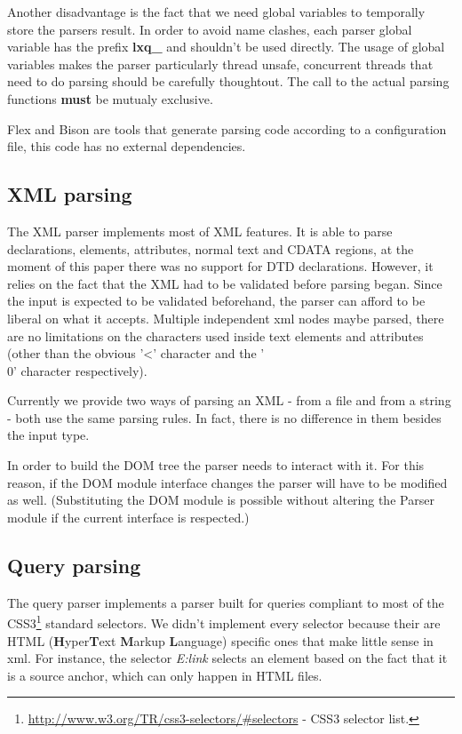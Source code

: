 \documentclass[a4paper]{report}
\begin{document}
	Another disadvantage is the fact that we need global variables to temporally store the parsers result. In order to avoid name clashes, each parser global variable has the prefix \textbf{lxq\_} and shouldn't be used directly. The usage of global variables makes the parser particularly thread unsafe, concurrent threads that need to do parsing should be carefully thoughtout. The call to the actual parsing functions \textbf{must} be mutualy exclusive.

	Flex and Bison are tools that generate parsing code according to a configuration file, this code has no external dependencies.

	\subsection{XML parsing}
		The XML parser implements most of XML features. It is able to parse declarations, elements, attributes, normal text and CDATA regions, at the moment of this paper there was no support for DTD declarations. However, it relies on the fact that the XML had to be validated before parsing began. Since the input is expected to be validated beforehand, the parser can afford to be liberal on what it accepts. Multiple independent xml nodes maybe parsed, there are no limitations on the characters used inside text elements and attributes (other than the obvious '<' character and the '\\0' character respectively).

		Currently we provide two ways of parsing an XML - from a file and from a string - both use the same parsing rules. In fact, there is no difference in them besides the input type.

		In order to build the DOM tree the parser needs to interact with it. For this reason, if the DOM module interface changes the parser will have to be modified as well. (Substituting the DOM module is possible without altering the Parser module if the current interface is respected.)

	\subsection{Query parsing}
	    The query parser implements a parser built for queries compliant to most of the CSS3\footnote{\url{http://www.w3.org/TR/css3-selectors/\#selectors} - CSS3 selector list.} standard selectors. We didn't implement every selector because their are HTML (\textbf{H}yper\textbf{T}ext \textbf{M}arkup \textbf{L}anguage) specific ones that make little sense in xml. For instance, the selector \emph{E:link} selects an element based on the fact that it is a source anchor, which can only happen in HTML files.
\end{document}
